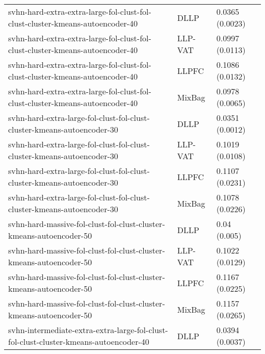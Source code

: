 \begin{longtable}{lll}
                                svhn-hard-extra-extra-large-fol-clust-fol-clust-cluster-kmeans-autoencoder-40 &      DLLP &                       0.0365 (0.0023) \\
                                svhn-hard-extra-extra-large-fol-clust-fol-clust-cluster-kmeans-autoencoder-40 &   LLP-VAT &                       0.0997 (0.0113) \\
                                svhn-hard-extra-extra-large-fol-clust-fol-clust-cluster-kmeans-autoencoder-40 &     LLPFC &                       0.1086 (0.0132) \\
                                svhn-hard-extra-extra-large-fol-clust-fol-clust-cluster-kmeans-autoencoder-40 &    MixBag &                       0.0978 (0.0065) \\
                                      svhn-hard-extra-large-fol-clust-fol-clust-cluster-kmeans-autoencoder-30 &      DLLP &                       0.0351 (0.0012) \\
                                      svhn-hard-extra-large-fol-clust-fol-clust-cluster-kmeans-autoencoder-30 &   LLP-VAT &                       0.1019 (0.0108) \\
                                      svhn-hard-extra-large-fol-clust-fol-clust-cluster-kmeans-autoencoder-30 &     LLPFC &                       0.1107 (0.0231) \\
                                      svhn-hard-extra-large-fol-clust-fol-clust-cluster-kmeans-autoencoder-30 &    MixBag &                       0.1078 (0.0226) \\
                                          svhn-hard-massive-fol-clust-fol-clust-cluster-kmeans-autoencoder-50 &      DLLP &                          0.04 (0.005) \\
                                          svhn-hard-massive-fol-clust-fol-clust-cluster-kmeans-autoencoder-50 &   LLP-VAT &                       0.1022 (0.0129) \\
                                          svhn-hard-massive-fol-clust-fol-clust-cluster-kmeans-autoencoder-50 &     LLPFC &                       0.1167 (0.0225) \\
                                          svhn-hard-massive-fol-clust-fol-clust-cluster-kmeans-autoencoder-50 &    MixBag &                       0.1157 (0.0265) \\
                        svhn-intermediate-extra-extra-large-fol-clust-fol-clust-cluster-kmeans-autoencoder-40 &      DLLP &                       0.0394 (0.0037) \\

\end{longtable}
